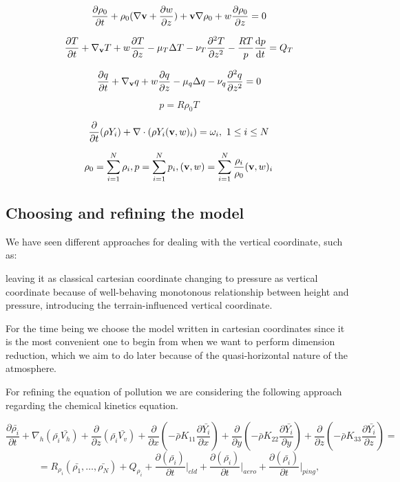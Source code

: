 \documentclass{article}
\begin{document}
\[ \frac{\partial \rho_0}{\partial t} + \rho_0 (\nabla \bold{v} + \frac{\partial w }{\partial z}) + \bold{v} \nabla \rho_0 + w \frac{\partial \rho_0}{\partial z} = 0 \]

\[ \frac{\partial T }{\partial t} + \nabla_{\bold{v}} T  + w  \frac{\partial T }{\partial z} - \mu_T \Delta T  -\nu_T \frac{\partial^2 T }{\partial z^2} -\frac{RT}{p} \frac{\mathrm{d}p}{\mathrm{d}t} = Q_T \]

\[ \frac{\partial q }{\partial t} + \nabla_{\bold{v}}q + w \frac{\partial q}{\partial z} - \mu_q \Delta q  - \nu_q \frac{\partial ^2 q }{\partial z^2} = 0 \]

\[ p = R \rho_0 T \]

\[ \frac{\partial}{\partial t} (\rho Y_i) + \nabla \cdot (\rho Y_i (\bold{v}, w)_i) = \omega_i, \text{  } 1 \leq i \leq N \]

\[ \rho_0 = \sum_{i =1}^{N} \rho_i, p = \sum_{i =1}^{N} p_i, (\bold{v}, w) = \sum_{i =1}^{N}\frac{\rho_i}{\rho_0} (\bold{v}, w)_i \]

\subsection{Choosing and refining the model}

We have seen different approaches for dealing with the vertical coordinate, such as:
\begin{outline}[enumerate]
\1 leaving it as classical cartesian coordinate
\1 changing to pressure as vertical coordinate because of well-behaving monotonous relationship between height and pressure,
\1 introducing the terrain-influenced vertical coordinate.
\end{outline}

For the time being we choose the model written in cartesian coordinates since it is the most convenient one to begin from when we want to perform dimension reduction, which we aim to do later because of the quasi-horizontal nature of the atmosphere.

For refining the equation of pollution we are considering the following approach regarding the chemical kinetics equation.

 \[ \frac{\partial \bar{\rho_i}}{\partial t}  + \nabla_{h} (\bar{\rho_i} \bar{V_h}) + \frac{\partial}{\partial z} (\bar{\rho_i} \bar{V_v}) + \frac{\partial}{\partial x} (-\bar{\rho}K_{11} \frac{\partial \bar{Y_i}}{\partial x}) + \frac{\partial}{\partial y} (-\bar{\rho}K_{22} \frac{\partial \bar{Y_i}}{\partial y}) + \frac{\partial}{\partial z} (- \bar{\rho} K_{33} \frac{\partial \bar{Y_i}}{\partial z}) = \]
 \[ = R_{\rho_i} (\bar{\rho_1}, \dots , \bar{\rho_N}) + Q_{\rho_i} + \frac{\partial (\bar{\rho_i})}{\partial t} \rvert_{cld} + \frac{\partial (\bar{\rho_i})}{\partial t} \rvert_{aero} + \frac{\partial (\bar{\rho_i})}{\partial t} \rvert_{ping},\]
 
\end{document}
